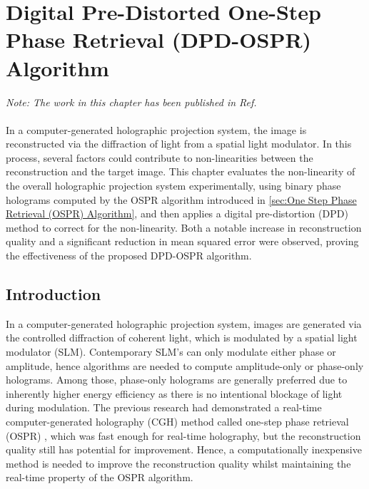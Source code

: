\chapter{Digital Pre-Distorted One-Step Phase Retrieval (DPD-OSPR) Algorithm} \label{sec:Digital Pre-Distorted One-Step Phase Retrieval (DPD-OSPR) Algorithm}

\graphicspath{{Chapter3/Figs/}}

\textit{Note: The work in this chapter has been published in Ref. \cite{Sha2023DPD}}\\\\

In a computer-generated holographic projection system, the image is reconstructed via the diffraction of light from a spatial light modulator. In this process, several factors could contribute to non-linearities between the reconstruction and the target image. This chapter evaluates the non-linearity of the overall holographic projection system experimentally, using binary phase holograms computed by the OSPR algorithm introduced in \cref{sec:One Step Phase Retrieval (OSPR) Algorithm}, and then applies a digital pre-distortion (DPD) method to correct for the non-linearity. Both a notable increase in reconstruction quality and a significant reduction in mean squared error were observed, proving the effectiveness of the proposed DPD-OSPR algorithm.


\section{Introduction}
In a computer-generated holographic projection system, images are generated via the controlled diffraction of coherent light, which is modulated by a spatial light modulator (SLM). Contemporary SLM's can only modulate either phase or amplitude, hence algorithms are needed to compute amplitude-only or phase-only holograms. Among those, phase-only holograms are generally preferred due to inherently higher energy efficiency as there is no intentional blockage of light during modulation. The previous research had demonstrated a real-time computer-generated holography (CGH) method called one-step phase retrieval (OSPR) \cite{Cable2004}, which was fast enough for real-time holography, but the reconstruction quality still has potential for improvement. Hence, a computationally inexpensive method is needed to improve the reconstruction quality whilst maintaining the real-time property of the OSPR algorithm.

